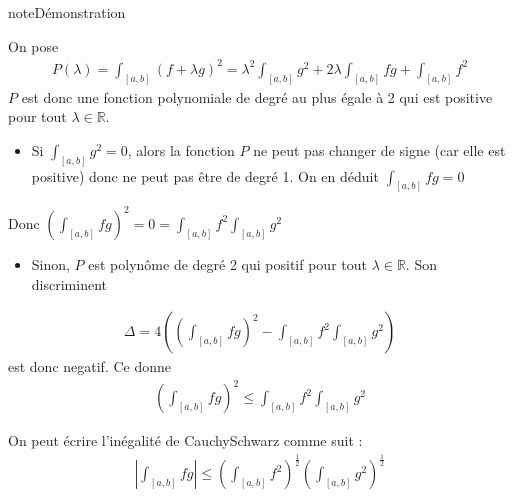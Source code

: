 \documentclass[letterpaper,10pt,french]{jupyterBook}
\begin{document}
\begin{sphinxadmonition}{note}{Démonstration}

\sphinxAtStartPar
On pose
\begin{equation*}
\begin{split}
P(\lambda) = \int_{[a, b]} (f+\lambda g)^2 = \lambda^2 \int_{[a, b]} g^2 + 2\lambda \int_{[a, b]} fg + \int_{[a, b]} f^2
\end{split}
\end{equation*}
\sphinxAtStartPar
\(P\) est donc une fonction polynomiale de degré au plus égale à 2 qui est positive pour tout \(\lambda \in \mathbb R\).
\begin{itemize}
\item {} 
\sphinxAtStartPar
Si \(\int_{[a, b]} g^2 = 0\), alors la fonction \(P\) ne peut pas changer de signe (car elle est positive) donc ne peut pas être de degré 1. On en déduit \(\int_{[a, b]} fg = 0\)

\end{itemize}

\sphinxAtStartPar
Donc \(\left (\int_{[a, b]} fg\right)^2 = 0=\int_{[a, b]} f^2 \int_{[a, b]} g^2\)
\begin{itemize}
\item {} 
\sphinxAtStartPar
Sinon, \(P\) est polynôme de degré 2 qui positif pour tout \(\lambda \in \mathbb R\). Son discriminent

\end{itemize}
\begin{equation*}
\begin{split}
\Delta = 4 \left (\left (\int_{[a, b]} fg\right)^2- \int_{[a, b]} f^2 \int_{[a, b]} g^2 \right)
\end{split}
\end{equation*}
\sphinxAtStartPar
est donc negatif. Ce donne
\begin{equation*}
\begin{split}
\left (\int_{[a, b]} fg\right)^2 \leq \int_{[a, b]} f^2 \int_{[a, b]} g^2
\end{split}
\end{equation*}\end{sphinxadmonition}

\sphinxAtStartPar
On peut écrire l’inégalité de Cauchy\sphinxhyphen{}Schwarz comme suit :
\begin{equation*}
\begin{split}
\left |\int_{[a, b]}fg \right | \leq \left (\int_{[a, b]} f^2 \right)^{\frac{1}{2}}  \left (\int_{[a, b]}g^2\right)^{\frac{1}{2}} 
\end{split}
\end{equation*}
\end{document}
